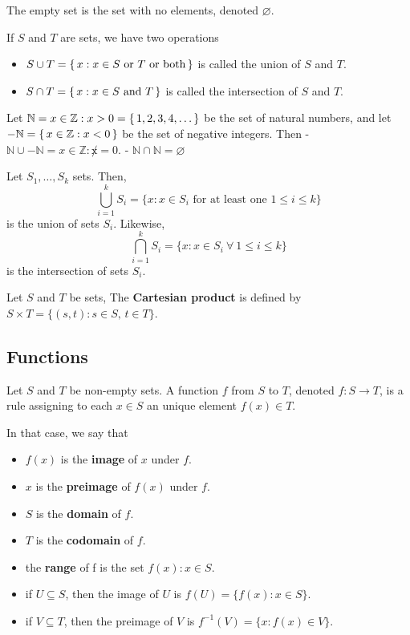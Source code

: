 \documentclass[12pt]{article}
\begin{document}
\begin{defn}
    The empty set is the set with no elements, denoted $\varnothing$.
\end{defn}

\begin{defn}
    If $S$ and $T$ are sets, we have two operations
    \begin{itemize}
        \item $S \cup T = \set{x : x \in S \text{ or } T \text{ or both}}$ is called the union of $S$ and $T$.
        \item $S \cap T = \set{x : x \in S \text{ and } T }$ is called the intersection of $S$ and $T$.
    \end{itemize}
\end{defn}
\begin{ex}
    Let $\mathbb{N} = {x \in \mathbb{Z} : x > 0} = \set{1, 2, 3, 4, \dots}$ be the set of natural numbers, and let $-\mathbb{N} = \set{x \in \mathbb{Z} : x < 0}$ be the set of negative integers. Then
    - $\mathbb{N} \cup -\mathbb{N} = {x \in \mathbb{Z} : \not  x= 0}$.
    - $\mathbb{N}\cap \mathbb{N} = \varnothing$
\end{ex}

\begin{defn}
    Let $S_{1}, \dots, S_{k}$ sets. Then, \[
        {}\bigcup^k_{i=1}S_{i} = \{ x: x \in S_{i} \text{ for at least one } 1 \leq i \leq k \}
    \]
    is the union of sets $S_{i}$. Likewise, \[
        {}\bigcap^k_{i=1}S_{i} = \{ x: x \in S_{i}\ \forall\ 1 \leq i \leq k \}
    \]
    is the intersection of sets $S_{i}$.
\end{defn}

\begin{defn}
    Let $S$ and $T$ be sets, The \textbf{Cartesian product} is defined by $S \times T = \{ (s,t): s \in S,\, t \in T\}$.
\end{defn}

\subsection{Functions}

\begin{defn}
    Let $S$ and $T$ be non-empty sets. A function $f$ from $S$ to $T$, denoted $f: S \to T$, is a rule assigning to each $x \in S$ an unique element $f(x) \in T$.
\end{defn}
In that case, we say that
\begin{itemize}
    \item $f(x)$ is the \textbf{image} of $x$ under $f$.
    \item $x$ is the \textbf{preimage} of $f (x)$ under $f$.
    \item $S$ is the \textbf{domain} of $f$.
    \item $T$ is the \textbf{codomain} of $f$.
    \item the \textbf{range} of f is the set ${f (x) : x \in S}$.
    \item if $U \subseteq S$, then the image of $U$ is $f(U) = \{ f(x):x \in S \}$.
    \item if $V \subseteq T$, then the preimage of $V$ is $f^{-1}(V) = \{ x: f(x) \in V \}$.
\end{itemize}
\end{document}
